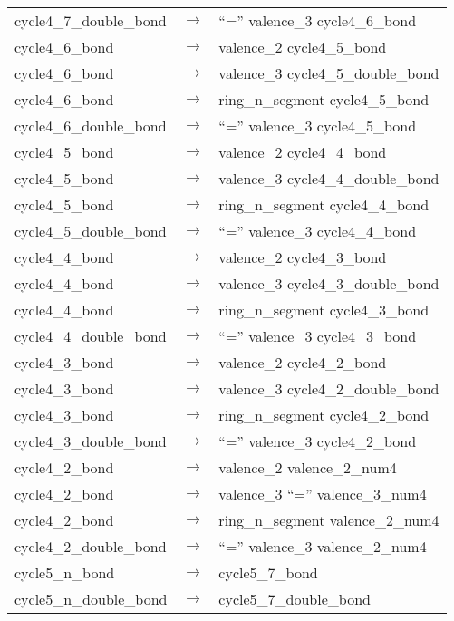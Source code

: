 \begin{longtable}{m{} p{} p{}}
    cycle4\_7\_double\_bond & $\rightarrow$ & ``='' valence\_3 cycle4\_6\_bond \\
    cycle4\_6\_bond & $\rightarrow$ & valence\_2 cycle4\_5\_bond \\
    cycle4\_6\_bond & $\rightarrow$ & valence\_3 cycle4\_5\_double\_bond \\
    cycle4\_6\_bond & $\rightarrow$ & ring\_n\_segment cycle4\_5\_bond \\
    cycle4\_6\_double\_bond & $\rightarrow$ & ``='' valence\_3 cycle4\_5\_bond \\
    cycle4\_5\_bond & $\rightarrow$ & valence\_2 cycle4\_4\_bond \\
    cycle4\_5\_bond & $\rightarrow$ & valence\_3 cycle4\_4\_double\_bond \\
    cycle4\_5\_bond & $\rightarrow$ & ring\_n\_segment cycle4\_4\_bond \\
    cycle4\_5\_double\_bond & $\rightarrow$ & ``='' valence\_3 cycle4\_4\_bond \\
    cycle4\_4\_bond & $\rightarrow$ & valence\_2 cycle4\_3\_bond \\
    cycle4\_4\_bond & $\rightarrow$ & valence\_3 cycle4\_3\_double\_bond \\
    cycle4\_4\_bond & $\rightarrow$ & ring\_n\_segment cycle4\_3\_bond \\
    cycle4\_4\_double\_bond & $\rightarrow$ & ``='' valence\_3 cycle4\_3\_bond \\
    cycle4\_3\_bond & $\rightarrow$ & valence\_2 cycle4\_2\_bond \\
    cycle4\_3\_bond & $\rightarrow$ & valence\_3 cycle4\_2\_double\_bond \\
    cycle4\_3\_bond & $\rightarrow$ & ring\_n\_segment cycle4\_2\_bond \\
    cycle4\_3\_double\_bond & $\rightarrow$ & ``='' valence\_3 cycle4\_2\_bond \\
    cycle4\_2\_bond & $\rightarrow$ & valence\_2 valence\_2\_num4 \\
    cycle4\_2\_bond & $\rightarrow$ & valence\_3 ``='' valence\_3\_num4 \\
    cycle4\_2\_bond & $\rightarrow$ & ring\_n\_segment valence\_2\_num4 \\
    cycle4\_2\_double\_bond & $\rightarrow$ & ``='' valence\_3 valence\_2\_num4 \\
    cycle5\_n\_bond & $\rightarrow$ & cycle5\_7\_bond \\
    cycle5\_n\_double\_bond & $\rightarrow$ & cycle5\_7\_double\_bond \\

\end{longtable}
